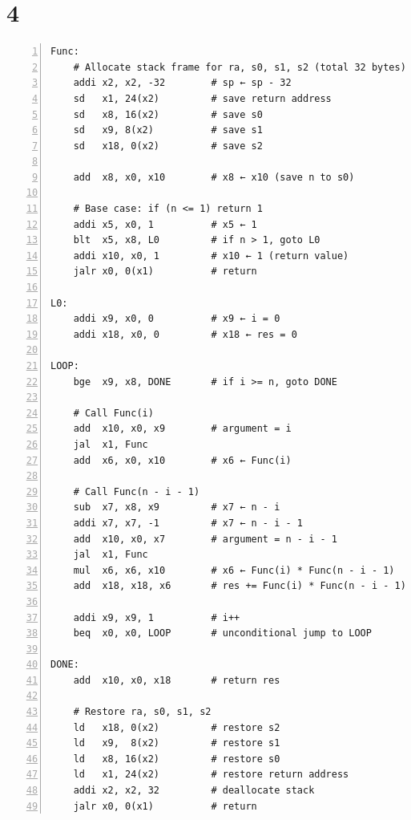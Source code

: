 \documentclass[12pt]{article}
\begin{document}
\section*{4}

\begin{lstlisting}[basicstyle=\ttfamily\small, numbers=left, numberstyle=\tiny\color{gray}, stepnumber=1, frame=single]
Func:
    # Allocate stack frame for ra, s0, s1, s2 (total 32 bytes)
    addi x2, x2, -32        # sp ← sp - 32
    sd   x1, 24(x2)         # save return address
    sd   x8, 16(x2)         # save s0
    sd   x9, 8(x2)          # save s1
    sd   x18, 0(x2)         # save s2

    add  x8, x0, x10        # x8 ← x10 (save n to s0)

    # Base case: if (n <= 1) return 1
    addi x5, x0, 1          # x5 ← 1
    blt  x5, x8, L0         # if n > 1, goto L0
    addi x10, x0, 1         # x10 ← 1 (return value)
    jalr x0, 0(x1)          # return

L0:
    addi x9, x0, 0          # x9 ← i = 0
    addi x18, x0, 0         # x18 ← res = 0

LOOP:
    bge  x9, x8, DONE       # if i >= n, goto DONE

    # Call Func(i)
    add  x10, x0, x9        # argument = i
    jal  x1, Func
    add  x6, x0, x10        # x6 ← Func(i)

    # Call Func(n - i - 1)
    sub  x7, x8, x9         # x7 ← n - i
    addi x7, x7, -1         # x7 ← n - i - 1
    add  x10, x0, x7        # argument = n - i - 1
    jal  x1, Func
    mul  x6, x6, x10        # x6 ← Func(i) * Func(n - i - 1)
    add  x18, x18, x6       # res += Func(i) * Func(n - i - 1)

    addi x9, x9, 1          # i++
    beq  x0, x0, LOOP       # unconditional jump to LOOP

DONE:
    add  x10, x0, x18       # return res

    # Restore ra, s0, s1, s2
    ld   x18, 0(x2)         # restore s2
    ld   x9,  8(x2)         # restore s1
    ld   x8, 16(x2)         # restore s0
    ld   x1, 24(x2)         # restore return address
    addi x2, x2, 32         # deallocate stack
    jalr x0, 0(x1)          # return
\end{lstlisting}
\end{document}
